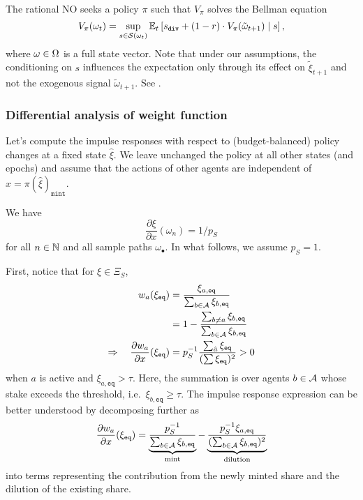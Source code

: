 The rational NO seeks a policy $\pi$ such that $V_\pi$ solves the Bellman equation
\[
  V_\pi(\omega_t) = \sup_{s\in\mathcal{S}(\omega_t)} 
    \mathbb{E}_t\left[ 
      s_\mathtt{div} + (1-r)\cdot V_\pi(\tilde\omega_{t+1}) 
      \mid s
    \right],
\]
where $\omega\in\Omega$ is a full state vector. 
%
Note that under our assumptions, the conditioning on $s$ influences the expectation only through its effect on $\tilde\xi_{t+1}$ and not the exogenous signal $\tilde\omega_{t+1}$.
%
See \cite[Chap.~4]{sutton2018reinforcement}.

\subsubsection{Differential analysis of weight function}

Let's compute the impulse responses with respect to (budget-balanced) policy changes at a fixed state $\hat{\xi}$.
%
We leave unchanged the policy at all other states (and epochs) and assume that the actions of other agents are independent of $x=\pi(\hat{\xi})_\mathtt{mint}$.


We have
\[
  \frac{\partial\xi}{\partial x}(\omega_n) = 1/p_S
\]
for all $n\in\mathbb{N}$ and all sample paths $\omega_\bullet$.
%
In what follows, we assume $p_S=1$.

First, notice that for $\xi\in\Xi_S$,
\begin{align*}
  w_a(\xi_\mathtt{eq}) &= \frac{ \xi_{a,\mathtt{eq}} }{ \sum_{b\in\mathcal{A}}\xi_{b,\mathtt{eq}} } \\
  &= 1 - \frac{ \sum_{b\neq a}\xi_{b,\mathtt{eq}} }{ \sum_{b\in\mathcal{A}}\xi_{b,\mathtt{eq}} }  \\
  \Rightarrow\quad  \frac{\partial w_a}{\partial x}(\xi_\mathtt{eq}) &= p_S^{-1}\frac{\sum_{\hat{a}} \xi_\mathtt{eq}}{(\sum \xi_\mathtt{eq})^2} > 0 \\
\end{align*}
when $a$ is active and $\xi_{a,\mathtt{eq}}>\tau$.
%
Here, the summation is over agents $b\in\mathcal{A}$ whose stake exceeds the threshold, i.e.~$\xi_{b,\mathtt{eq}}\geq\tau$.
%
The impulse response expression can be better understood by decomposing further as
\[
  \frac{\partial w_a}{\partial x}(\xi_\mathtt{eq}) = 
    \underbrace{ \frac{ p_S^{-1} }{ \sum_{b\in\mathcal{A}}\xi_{b,\mathtt{eq}} } }_{\text{mint}} - 
    \underbrace{ \frac{ p_S^{-1}\xi_{a,\mathtt{eq}} }{ (\sum_{b\in\mathcal{A}}\xi_{b,\mathtt{eq}})^2 } }_{\text{dilution}}
\]
into terms representing the contribution from the newly minted share and the dilution of the existing share.

